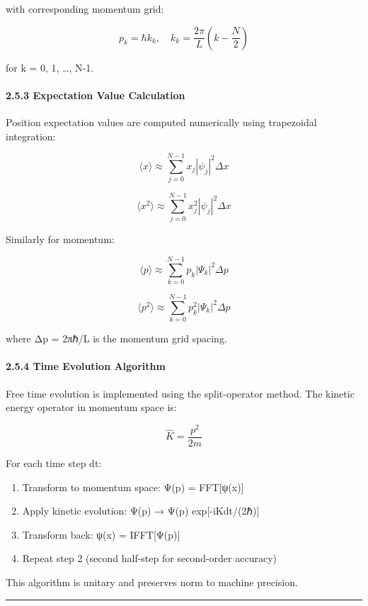 \documentclass[
]{article}
\providecommand{\tightlist}{%
  \setlength{\itemsep}{0pt}\setlength{\parskip}{0pt}}
\begin{document}
with corresponding momentum grid:

\[p_k = \hbar k_k, \quad k_k = \frac{2\pi}{L}\left(k - \frac{N}{2}\right)\]

for k = 0, 1, \ldots, N-1.

\paragraph{2.5.3 Expectation Value
Calculation}\label{expectation-value-calculation}

Position expectation values are computed numerically using trapezoidal
integration:

\[\langle x \rangle \approx \sum_{j=0}^{N-1} x_j |\psi_j|^2 \Delta x\]

\[\langle x^2 \rangle \approx \sum_{j=0}^{N-1} x_j^2 |\psi_j|^2 \Delta x\]

Similarly for momentum:

\[\langle p \rangle \approx \sum_{k=0}^{N-1} p_k |\Psi_k|^2 \Delta p\]

\[\langle p^2 \rangle \approx \sum_{k=0}^{N-1} p_k^2 |\Psi_k|^2 \Delta p\]

where Δp = 2πℏ/L is the momentum grid spacing.

\paragraph{2.5.4 Time Evolution
Algorithm}\label{time-evolution-algorithm}

Free time evolution is implemented using the split-operator method. The
kinetic energy operator in momentum space is:

\[\hat{K} = \frac{p^2}{2m}\]

For each time step dt:

\begin{enumerate}
\def\labelenumi{\arabic{enumi}.}
\tightlist
\item
  Transform to momentum space: Ψ(p) = FFT{[}ψ(x){]}
\item
  Apply kinetic evolution: Ψ(p) → Ψ(p) exp{[}-iKdt/(2ℏ){]}
\item
  Transform back: ψ(x) = IFFT{[}Ψ(p){]}
\item
  Repeat step 2 (second half-step for second-order accuracy)
\end{enumerate}

This algorithm is unitary and preserves norm to machine precision.

\begin{center}\rule{0.5\linewidth}{0.5pt}\end{center}
\end{document}
